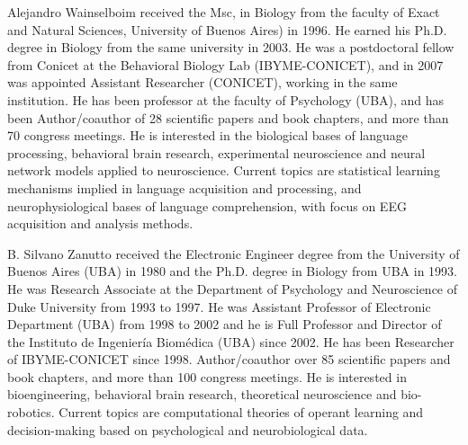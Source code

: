 \documentclass[10pt,journal,compsoc]{IEEEtran}
\begin{document}
\begin{IEEEbiography}{Alejandro Wainselboim}
received the Msc, in Biology from the faculty of Exact and Natural Sciences, University of Buenos Aires) in 1996. He earned his Ph.D. degree in Biology from the same university in 2003. He was a postdoctoral fellow from Conicet at the Behavioral Biology Lab (IBYME-CONICET), and in 2007 was appointed Assistant Researcher (CONICET), working in the same institution. He has been professor at the faculty of Psychology (UBA), and has been Author/coauthor of 28 scientific papers and book chapters, and more than 70 congress meetings. He is interested in the biological bases of language processing, behavioral brain research, experimental neuroscience and neural network models applied to neuroscience. Current topics are statistical learning mechanisms implied in language acquisition and processing, and neurophysiological bases of language comprehension, with focus on EEG acquisition and analysis methods.
\end{IEEEbiography}

\begin{IEEEbiography}{B. Silvano Zanutto}
received the Electronic Engineer degree from the University of Buenos Aires (UBA) in 1980 and the Ph.D. degree in Biology from UBA in 1993. He was Research Associate at the Department of Psychology and Neuroscience of Duke University from 1993 to 1997. He was Assistant Professor of Electronic Department (UBA) from 1998 to 2002 and he is Full Professor and Director of the Instituto de Ingeniería Biomédica (UBA) since 2002. He has been Researcher of IBYME-CONICET since 1998. Author/coauthor over 85 scientific papers and book chapters, and more than 100 congress meetings. He is interested in bioengineering, behavioral brain research, theoretical neuroscience and bio-robotics. Current topics are computational theories of operant learning and decision-making based on psychological and neurobiological data.
\end{IEEEbiography}
\end{document}
